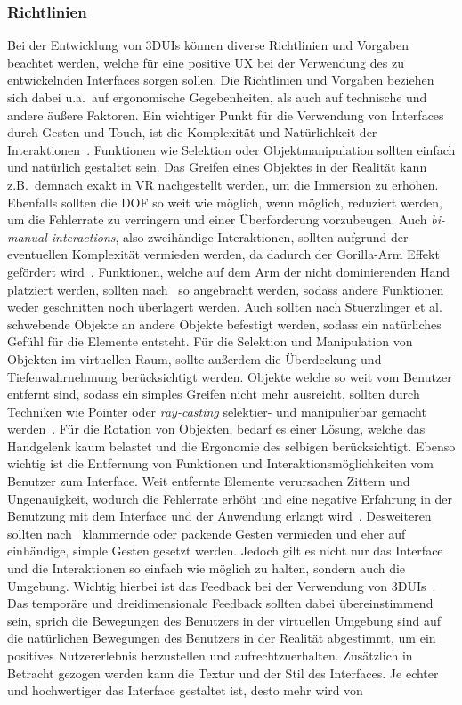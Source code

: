 \subsubsection{Richtlinien}
Bei der Entwicklung von 3DUIs können diverse Richtlinien und Vorgaben beachtet werden, welche für eine positive UX bei der Verwendung des zu entwickelnden Interfaces sorgen sollen. Die Richtlinien und Vorgaben beziehen sich dabei u.a.~auf ergonomische Gegebenheiten, als auch auf technische und andere äußere Faktoren. Ein wichtiger Punkt für die Verwendung von Interfaces durch Gesten und Touch, ist die Komplexität und Natürlichkeit der Interaktionen~\cite{asurveyon3dobjectmanipulation}. Funktionen wie Selektion oder Objektmanipulation sollten einfach und natürlich gestaltet sein. Das Greifen eines Objektes in der Realität kann z.B.~demnach exakt in VR nachgestellt werden, um die Immersion zu erhöhen. Ebenfalls sollten die DOF so weit wie möglich, wenn möglich, reduziert werden, um die Fehlerrate zu verringern und einer Überforderung vorzubeugen. Auch \textit{bi-manual interactions}, also zweihändige Interaktionen, sollten aufgrund der eventuellen Komplexität vermieden werden, da dadurch der Gorilla-Arm Effekt gefördert wird~\cite{asurveyon3dobjectmanipulation}. Funktionen, welche auf dem Arm der nicht dominierenden Hand platziert werden, sollten nach~\cite{constraints3duis} so angebracht werden, sodass andere Funktionen weder geschnitten noch überlagert werden. Auch sollten nach Stuerzlinger et al. schwebende Objekte an andere Objekte befestigt werden, sodass ein natürliches Gefühl für die Elemente entsteht. Für die Selektion und Manipulation von Objekten im virtuellen Raum, sollte außerdem die Überdeckung und Tiefenwahrnehmung berücksichtigt werden. Objekte welche so weit vom Benutzer entfernt sind, sodass ein simples Greifen nicht mehr ausreicht, sollten durch Techniken wie Pointer oder \textit{ray-casting} selektier- und manipulierbar gemacht werden~\cite{anintroductionto3dspacial}. Für die Rotation von Objekten, bedarf es einer Lösung, welche das Handgelenk kaum belastet und die Ergonomie des selbigen berücksichtigt. Ebenso wichtig ist die Entfernung von Funktionen und Interaktionsmöglichkeiten vom Benutzer zum Interface. Weit entfernte Elemente verursachen Zittern und Ungenauigkeit, wodurch die Fehlerrate erhöht und eine negative Erfahrung in der Benutzung mit dem Interface und der Anwendung erlangt wird~\cite{anintroductionto3dspacial}. Desweiteren sollten nach~\cite{virtualrealityandgames} klammernde oder packende Gesten vermieden und eher auf einhändige, simple Gesten gesetzt werden. Jedoch gilt es nicht nur das Interface und die Interaktionen so einfach wie möglich zu halten, sondern auch die Umgebung. Wichtig hierbei ist das Feedback bei der Verwendung von 3DUIs~\cite{theoryandpracticebook}. Das temporäre und dreidimensionale Feedback sollten dabei übereinstimmend sein, sprich die Bewegungen des Benutzers in der virtuellen Umgebung sind auf die natürlichen Bewegungen des Benutzers in der Realität abgestimmt, um ein positives Nutzererlebnis herzustellen und aufrechtzuerhalten. Zusätzlich in Betracht gezogen werden kann die Textur und der Stil des Interfaces. Je echter und hochwertiger das Interface gestaltet ist, desto mehr wird von 